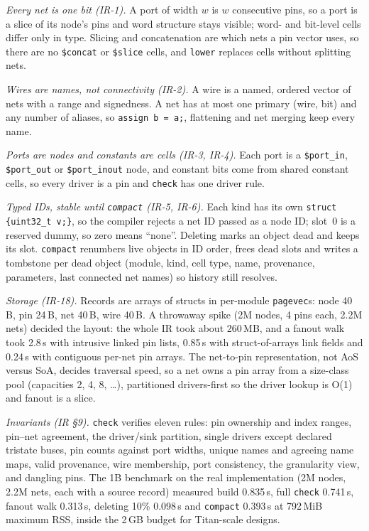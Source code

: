 \documentclass[conference]{IEEEtran}
\newcommand{\code}[1]{\texttt{#1}}
\begin{document}
\emph{Every net is one bit (IR-1).} A port of width $w$ is $w$ consecutive pins, so a port is a
slice of its node's pins and word structure stays visible; word- and bit-level cells differ only
in type. Slicing and concatenation are which nets a pin vector uses, so there are no
\code{\$concat} or \code{\$slice} cells, and \code{lower} replaces cells without
splitting nets.

\emph{Wires are names, not connectivity (IR-2).} A wire is a named, ordered vector of nets with
a range and signedness. A net has at most one primary (wire, bit) and any number of aliases, so
\code{assign b = a;}, flattening and net merging keep every name.

\emph{Ports are nodes and constants are cells (IR-3, IR-4).} Each port is a \code{\$port\_in},
\code{\$port\_out} or \code{\$port\_inout} node, and constant bits come from shared constant
cells, so every driver is a pin and \code{check} has one driver rule.

\emph{Typed IDs, stable until \code{compact} (IR-5, IR-6).} Each kind has its own
\code{struct \{uint32\_t v;\}}, so the compiler rejects a net ID passed as a node ID; slot~0 is a
reserved dummy, so zero means ``none''. Deleting marks an object dead and keeps its slot.
\code{compact} renumbers live objects in ID order, frees dead slots and writes a tombstone per
dead object (module, kind, cell type, name, provenance, parameters, last connected net names) so
history still resolves.

\emph{Storage (IR-18).} Records are arrays of structs in per-module \code{pagevec}s: node
40\,B, pin 24\,B, net 40\,B, wire 40\,B. A throwaway spike (2M nodes, 4 pins each, 2.2M nets)
decided the layout: the whole IR took about 260\,MB, and a fanout walk took 2.8\,s with
intrusive linked pin lists, 0.85\,s with struct-of-arrays link fields and 0.24\,s with
contiguous per-net pin arrays. The net-to-pin representation, not AoS versus SoA, decides
traversal speed, so a net owns a pin array from a size-class pool (capacities 2, 4, 8,
\ldots), partitioned drivers-first so the driver lookup is O(1) and fanout is a slice.

\emph{Invariants (IR \S9).} \code{check} verifies eleven rules: pin ownership and index ranges,
pin--net agreement, the driver/sink partition, single drivers except declared tristate buses,
pin counts against port widths, unique names and agreeing name maps, valid provenance, wire
membership, port consistency, the granularity view, and dangling pins. The 1B benchmark on the
real implementation (2M nodes, 2.2M nets, each with a source record) measured build 0.835\,s,
full \code{check} 0.741\,s, fanout walk 0.313\,s, deleting 10\% 0.098\,s and \code{compact}
0.393\,s at 792\,MiB maximum RSS, inside the 2\,GB budget for Titan-scale designs.
\end{document}
